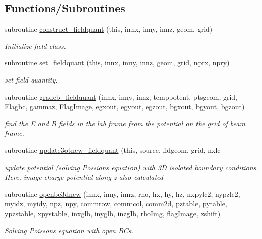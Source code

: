 \subsection*{Functions/\+Subroutines}
\begin{DoxyCompactItemize}
\item 
subroutine \mbox{\hyperlink{namespacefieldquantclass_a02f323941fc76278b26a3aa06fa3bbdd}{construct\+\_\+fieldquant}} (this, innx, inny, innz, geom, grid)
\begin{DoxyCompactList}\small\item\em Initialize field class. \end{DoxyCompactList}\item 
subroutine \mbox{\hyperlink{namespacefieldquantclass_a2d6cd3fb8b4d962adbd4206a5fbd13ce}{set\+\_\+fieldquant}} (this, innx, inny, innz, geom, grid, nprx, npry)
\begin{DoxyCompactList}\small\item\em set field quantity. \end{DoxyCompactList}\item 
subroutine \mbox{\hyperlink{namespacefieldquantclass_a1424ab249c01287bbfe998370d2c5703}{gradeb\+\_\+fieldquant}} (innx, inny, innz, temppotent, ptsgeom, grid, Flagbc, gammaz, Flag\+Image, egxout, egyout, egzout, bgxout, bgyout, bgzout)
\begin{DoxyCompactList}\small\item\em find the E and B fields in the lab frame from the potential on the grid of beam frame. \end{DoxyCompactList}\item 
subroutine \mbox{\hyperlink{namespacefieldquantclass_a06d0461c3c52859b9fa8b0c4d5f0db46}{update3otnew\+\_\+fieldquant}} (this, source, fldgeom, grid, nxlc
\begin{DoxyCompactList}\small\item\em update potential (solving Possion\textquotesingle{}s equation) with 3D isolated boundary conditions. Here, image charge potential along z also calculated \end{DoxyCompactList}\item 
subroutine \mbox{\hyperlink{namespacefieldquantclass_aae4177005bffdb768a50a98b860c111a}{openbc3dnew}} (innx, inny, innz, rho, hx, hy, hz, nxpylc2, nypzlc2, myidz, myidy, npz, npy, commrow, commcol, comm2d, pztable, pytable, ypzstable, xpystable, inxglb, inyglb, inzglb, rho\+Img, flag\+Image, zshift)
\begin{DoxyCompactList}\small\item\em Solving Poisson\textquotesingle{}s equation with open B\+Cs. \end{DoxyCompactList}\item 

\end{DoxyCompactItemize}
